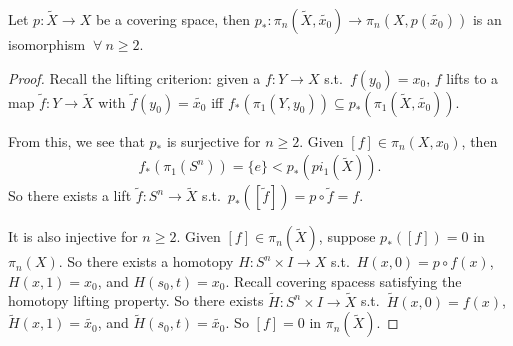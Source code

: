 \documentclass[12pt,class=article,crop=false]{standalone}
\begin{document}
\begin{thm}
Let $ p: \widetilde{ X} \to X$ be a covering space, then $ p_*: \pi_n(\widetilde{ X}, \widetilde{ x_0}) \to \pi_n(X,p(\widetilde{ x_0}))$ is an isomorphism $ \ \forall \ n \geq 2$.
\end{thm}
\begin{proof}
Recall the lifting criterion: given a $ f:Y \to X$ s.t.\ $ f(y_0) = x_0$, $ f$ lifts to a map  $ \widetilde{ f}: Y \to \widetilde{ X}$ with $ \widetilde{ f} (y_0) = \widetilde{ x_0}$ iff $ f_*(\pi_1(Y,y_0)) \subseteq p_*(\pi_1(\widetilde{ X},\widetilde{ x_0}))$.

From this, we see that $ p_*$ is surjective for  $ n\geq 2$. Given  $ [f] \in \pi_n(X,x_0)$, then
\begin{align*}
	f_*(\pi_1(S^{n})) = \{e\} < p_*(pi_1(\widetilde{ X})) .
\end{align*}
So there exists a lift $ \widetilde{ f} : S^{n} \to \widetilde{ X}$ s.t.\ $ p_*([\widetilde{ f}]) =p \circ \widetilde{ f} = f$. 

It is also injective for $ n \geq 2$. Given $ [f] \in \pi_n(\widetilde{ X})$, suppose  $ p_*([f]) = 0$ in  $ \pi_n(X)$. So there exists a homotopy $ H : S^{n} \times I \to X$ s.t.\ $ H(x,0) = p \circ f(x)$, $ H(x,1) = x_0$, and $ H(s_0,t) = x_0$. Recall covering spacess satisfying the homotopy lifting property. So there exists $ \widetilde{ H}: S^{n} \times I \to \widetilde{ X}$ s.t.\ $ \widetilde{ H}(x,0) = f(x)$, $ \widetilde{ H}(x,1) = \widetilde{ x_0}$, and $ \widetilde{ H}(s_0,t) = \widetilde{ x_0}$. So $ [f] = 0$ in  $ \pi_n(\widetilde{ X})$.
\end{proof}
\end{document}
